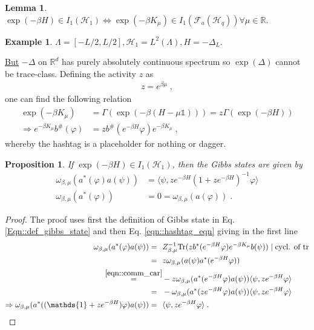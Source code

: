 \documentclass[
a4paper, %
11pt, %
onecolumn, %
openany, %
]{memoir}
\theoremstyle{definition}
\newtheorem{example}[definition]{Example}
\theoremstyle{remark}
\theoremstyle{plain}
\newtheorem{prop}[definition]{Proposition}
\newtheorem{lemma}[definition]{Lemma}
\begin{document}
\begin{lemma}
	$\exp(-\beta H)\in I_1(\mathcal{H}_1)\Leftrightarrow \exp(-\beta K_{\mu})\in I_1(\mathcal{F}_a(\mathcal{H}_q))\forall\mu\in \mathbb{R}$.
\end{lemma}
\begin{example}
	$\Lambda=[-L/2,L/2], \mathcal{H}_1=L^2(\Lambda), H=-\Delta_L$.

\underline{But} $-\Delta$ on $\mathbb{R}^d$ has purely absolutely continuous spectrum so $\exp(\Delta)$ cannot be trace-class. Defining the activity $z$ as \begin{align}
z=e^{\beta\mu}\; ,
\end{align}
one can find the following relation \begin{align}
\exp(-\beta K_{\mu})&=\Gamma(\exp(-\beta(H-\mu\mathds{1})))=z\Gamma(\exp(-\beta H))\\
\Rightarrow e^{-\beta K_{\mu}}b^{\#}(\varphi)&=zb^{\#}(e^{-\beta H}\varphi)e^{-\beta K_{\mu}}\label{eqn::hashtag_eqn}\; ,
\end{align}
whereby the hashtag is a placeholder for nothing or dagger.
\begin{prop}
	If $\exp(-\beta H)\in I_1(\mathcal{H}_1)$, then the Gibbs states are given by\begin{align}
	\omega_{\beta,\mu}(a^{*}(\varphi)a(\psi))&=\langle \psi, ze^{-\beta H}(1+ze^{-\beta H})^{-1}\varphi\rangle\\
	\omega_{\beta,\mu}(a^*(\varphi))&=0=\omega_{\beta,\mu}(a(\varphi))\; .
	\end{align}
\end{prop}
\begin{proof}
	The proof uses first the definition of Gibbs state in Eq. \eqref{Eqn::def_gibbs_state} and then Eq. \eqref{eqn::hashtag_eqn} giving in the first line\begin{align}
	\omega_{\beta,\mu}(a^{*}(\varphi)a(\psi))=~~&Z^{-1}_{\beta,\mu}\mathrm{Tr}(zb^*(e^{-\beta H}\varphi)e^{-\beta K_{\mu}}b(\psi)) \mid \text{cycl. of tr}\\
	=~~&z\omega_{\beta,\mu}(a(\psi)a^*(e^{-\beta H}\varphi)) \\
	\overset{\eqref{eqn::comm_car}}{=}& -z\omega_{\beta,\mu}(a^*(e^{-\beta H}\varphi)a(\psi))\langle \psi, ze^{-\beta H}\varphi\rangle\\
	=~~&-\omega_{\beta,\mu}(a^*(ze^{-\beta H}\varphi)a(\psi))\langle \psi, ze^{-\beta H}\varphi\rangle\\
	\Rightarrow \omega_{\beta,\mu}(a^*((\mathds{1}+ze^{-\beta H})\varphi)a(\psi))=~~&\langle \psi, ze^{-\beta H} \varphi\rangle\; .

\end{align}
\end{proof}
\end{example}
\end{document}
